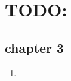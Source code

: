 \documentclass{pset}
\begin{document}
\section{TODO:}
\subsection{chapter 3}
\begin{enumerate}
    \item
\end{enumerate}
\end{document}
